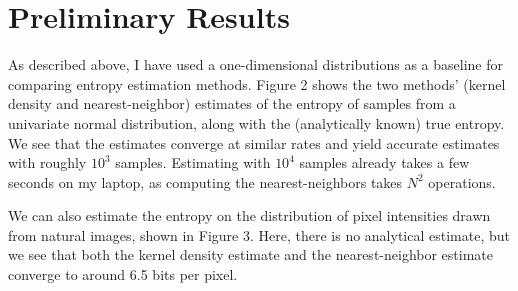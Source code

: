 \documentclass[10pt,twocolumn,letterpaper]{article}
\begin{document}


\section{Preliminary Results}
As described above, I have used a one-dimensional distributions as a baseline for comparing entropy estimation methods. Figure 2 shows the two methods' (kernel density and nearest-neighbor) estimates of the entropy of samples from a univariate normal distribution, along with the (analytically known) true entropy. We see that the estimates converge at similar rates and yield accurate estimates with roughly $10^3$ samples. Estimating with $10^4$ samples already takes a few seconds on my laptop, as computing the nearest-neighbors takes $N^2$ operations.

We can also estimate the entropy on the distribution of pixel intensities drawn from natural images, shown in Figure 3. Here, there is no analytical estimate, but we see that both the kernel density estimate and the nearest-neighbor estimate converge to around 6.5 bits per pixel.


\end{document}
